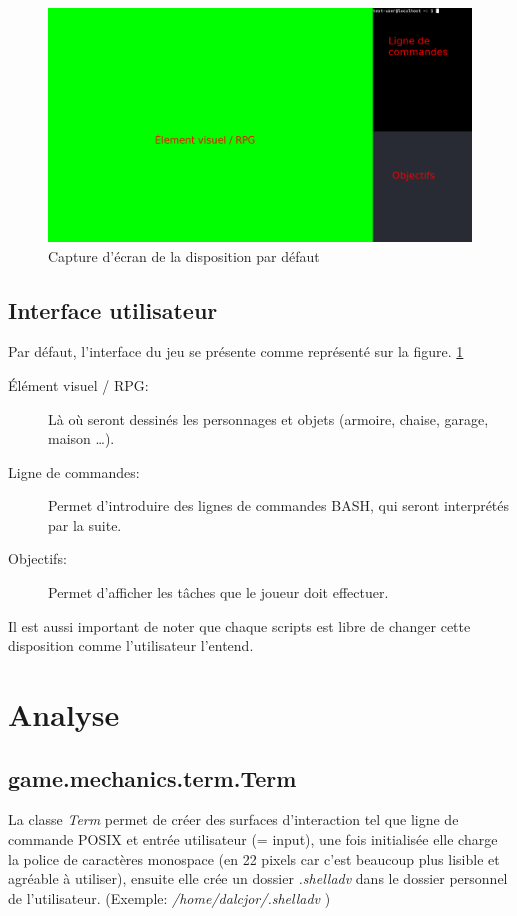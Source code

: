 \documentclass{report}
\begin{document}
\begin{figure}[hb!]
  \includegraphics[width=\linewidth]{img/image1}
  \caption{Capture d'écran de la disposition par défaut}
  \label{fig:screen1}
\end{figure}
\section {Interface utilisateur}
Par défaut, l’interface du jeu se présente comme représenté sur la figure. \ref{fig:screen1}
\begin{description}
  \item [Élément visuel / RPG:] Là où seront dessinés les personnages et objets (armoire, chaise, garage, maison …).
  \item [Ligne de commandes:] Permet d’introduire des lignes de commandes BASH, qui seront interprétés par la suite.
  \item [Objectifs:] Permet d’afficher les tâches que le joueur doit effectuer.
\end{description}
\par Il est aussi important de noter que chaque scripts est libre de changer cette disposition comme l'utilisateur l'entend.

\chapter{Analyse}
\section{game.mechanics.term.Term}
La classe \emph{Term} permet de créer des surfaces d'interaction tel que ligne de commande POSIX et entrée utilisateur (= input), une fois initialisée elle charge la police de caractères monospace (en 22 pixels car c’est beaucoup plus lisible et agréable à utiliser), ensuite elle crée un dossier \emph{.shelladv} dans le dossier personnel de l’utilisateur. (Exemple: \emph{/home/dalcjor/.shelladv} )
\end{document}
